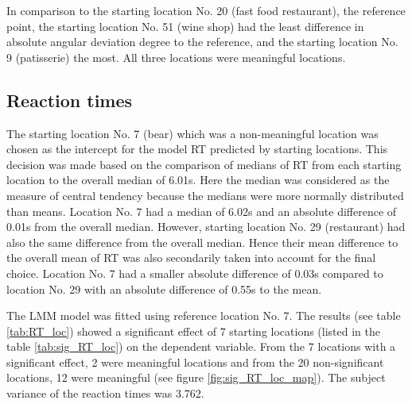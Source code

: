 In comparison to the starting location No. 20 (fast food restaurant), the reference point, the starting location No. 51 (wine shop) had the least difference in absolute angular deviation degree to the reference, and the starting location No. 9 (patisserie) the most. All three locations were meaningful locations.

\subsection{Reaction times}

The starting location No. 7 (bear) which was a non-meaningful location was chosen as the intercept for the model RT predicted by starting locations. This decision was made based on the comparison of medians of RT from each starting location to the overall median of 6.01s. Here the median was considered as the measure of central tendency because the medians were more normally distributed than means. Location No. 7 had a median of 6.02s and an absolute difference of 0.01s from the overall median. However, starting location No. 29 (restaurant) had also the same difference from the overall median. Hence their mean difference to the overall mean of RT was also secondarily taken into account for the final choice. Location No. 7 had a smaller absolute difference of 0.03s compared to location No. 29 with an absolute difference of 0.55s to the mean. 

The LMM model was fitted using reference location No. 7. The results (see table \ref{tab:RT_loc}) showed a significant effect of 7 starting locations (listed in the table \ref{tab:sig_RT_loc}) on the dependent variable. From the 7 locations with a significant effect, 2 were meaningful locations and from the 20 non-significant locations, 12 were meaningful (see figure \ref{fig:sig_RT_loc_map}). The subject variance of the reaction times was 3.762.


